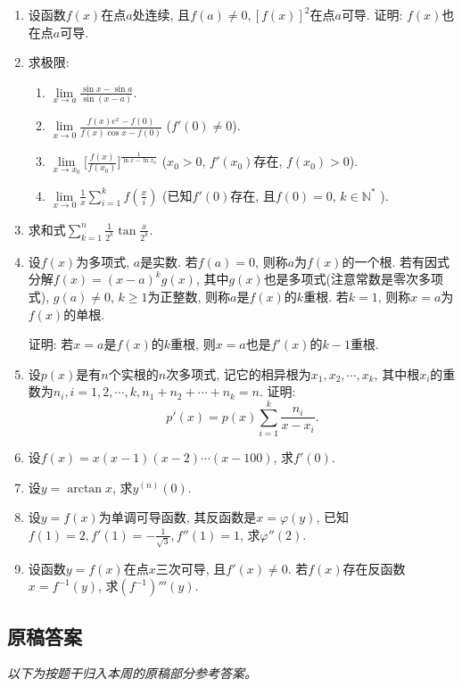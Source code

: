 \documentclass[UTF8,11pt, a4paper, oneside, fontset=none]{ctexbook}
\begin{document}
\begin{enumerate}
\item 设函数$f(x)$在点$a$处连续, 且$f(a) \neq 0, [f(x)]^2$在点$a$可导. 证明: $f(x)$也在点$a$可导. 
\item 求极限:
\begin{enumerate}
\item $\lim\limits_{x \to a} \frac{\sin x - \sin a}{\sin(x -a)}$.
\item $\lim\limits_{x \to 0} \frac{f(x) e^x -f(0)}{f(x) \cos x - f(0)}$ ($f'(0) \neq 0$).
\item $\lim\limits_{x \to x_0} \Big[ \frac{f(x)}{f(x_0)}\Big]^{\frac{1}{\ln x- \ln x_0}}$ ($x_0>0$, $f'(x_0)$存在, $f(x_0)>0$).
\item $\lim\limits_{x \to 0} \frac{1}{x} \sum_{i=1}^k f\left( \frac{x}{i}\right)$ (已知$f'(0)$存在, 且$f(0) =0$, $k \in \mathbb N^*$ ).
\end{enumerate}
\item 求和式$\sum_{k=1}^n \frac{1}{2^k} \tan \frac{x}{2^k} $.
\item 设$f(x)$为多项式, $a$是实数. 若$f(a) =0$, 则称$a$为$f(x)$的一个根. 若有因式分解$f(x) = (x - a)^k g(x)$, 其中$g(x)$也是多项式(注意常数是零次多项式), $g(a) \neq 0$, $k \geq 1$为正整数, 则称$a$是$f(x)$的$k$重根. 若$k=1$, 则称$x = a$为$f(x)$的单根. 

证明: 若$x =a $是$f(x)$的$k$重根, 则$x =a $也是$f'(x)$的$k-1$重根.
\item 设$p(x)$是有$n$个实根的$n$次多项式, 记它的相异根为$x_1, x_2, \cdots, x_k$, 其中根$x_i$的重数为$n_i, i=1, 2, \cdots, k, n_1 + n_2 + \cdots + n_k =n$. 证明:
\[
p'(x) = p(x) \sum_{i=1}^k \frac{n_i}{x-x_i}.
\]
\item 设$f(x) = x(x-1)(x-2) \cdots (x-100)$, 求$f'(0)$.
\item 设$y = \arctan x$, 求$y^{(n)}(0)$.
\item 设$y = f(x)$为单调可导函数, 其反函数是$x = \varphi(y)$, 已知$f(1) = 2, f'(1) = - \frac{1}{\sqrt 3}, f''(1) = 1$, 求$\varphi''(2)$.
\item 设函数$y = f(x)$在点$x$三次可导, 且$f'(x) \neq 0$. 若$f(x)$存在反函数$x = f^{-1}(y)$, 求$(f^{-1})'''(y)$.
\end{enumerate}

\clearpage

\subsection*{原稿答案}

\noindent\emph{以下为按题干归入本周的原稿部分参考答案。}
\end{document}
